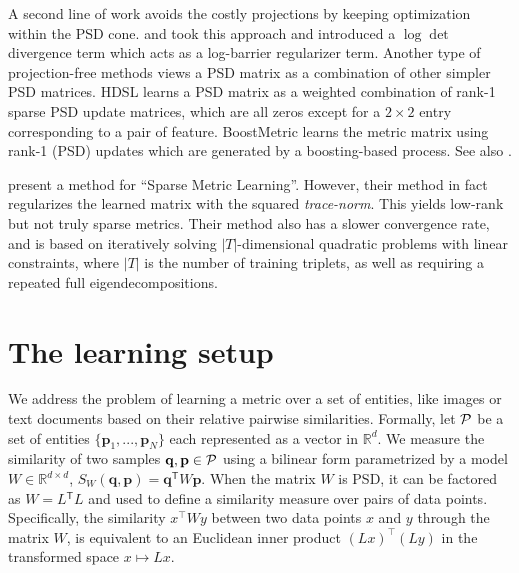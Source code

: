 \documentclass[twoside,11pt]{article}
\newcommand\todo[1]{\textbf{<ToDo:#1}!>}
\newcommand\mat[1]{{#1}}
\renewcommand\vec[1]{\mathbf{#1}}
\newcommand{\T}{{}^\mathsf{T}}
\newcommand{\W}{\mat{W}}
\newcommand{\Rd}{\mathbb{R}^d}
\newcommand{\ignore}[1]{}
\newcommand{\q}{{\vec{q}}}
\newcommand{\p}{{\vec{p}}}
\newcommand{\cholL}{\mat{L}}
\begin{document}
A second line of work avoids the costly projections by keeping optimization within the PSD cone. \citet{davis2007information} and \citet{lego} took this approach and introduced a $\log \det$ divergence term which acts as a log-barrier regularizer term. Another type of projection-free methods views a PSD matrix as a combination of other simpler PSD matrices. HDSL \citep{HDSL} learns a PSD matrix as a weighted combination of rank-1 sparse PSD update matrices, which are all zeros except for a $2\times2$ entry corresponding to a pair of feature. BoostMetric \citep{boost} learns the metric matrix using rank-1 (PSD) updates which are generated by a boosting-based process. See also \citet{bi2011adaboost, liu2012robust}.

\citet{ying2009sparse} present a method for ``Sparse Metric Learning''. However, their method in fact regularizes the learned matrix with the squared \emph{trace-norm}. This yields low-rank but not truly sparse metrics. Their method also has a slower convergence rate, and is based on iteratively solving $|T|$-dimensional quadratic problems with linear constraints, where $|T|$ is the number of training triplets, as well as requiring a repeated full eigendecompositions.

\ignore{
We take here an approach based on minimizing a strongly convex function using block-coordinate descent. There is a well established body of work analyzing the convergence of block-coordinate descent, e.g. \citep{nesterov2012efficiency,richtarik2014iteration}. We discuss this further in Section 5 below.
}

\section{The learning setup}
We address the problem of learning a metric over a set of
entities, like images or text documents based on their
relative pairwise similarities. Formally, let $\cal{P}$ be a set of entities $\{\p_1,...,\p_N\}$ each represented as a vector in $\Rd$. We measure the similarity of two samples $\q, \p \in \cal{P}$ using a bilinear form parametrized by a model $\W \in \mathbb{R}^{d \times d}$, $S_{\W}(\q, \p) = \q\T \W \p$.
When the matrix $\W$ is PSD, it can be factored as $\W = \cholL\T \cholL$ and used to define a similarity measure over pairs of data points. Specifically, the similarity $x^\top\W y$ between two data points $x$ and $y$ through the matrix $\W$, is equivalent to an Euclidean inner product  $(\cholL x)^\top(\cholL y)$ in the transformed space $x \mapsto \cholL x$. 
\end{document}
